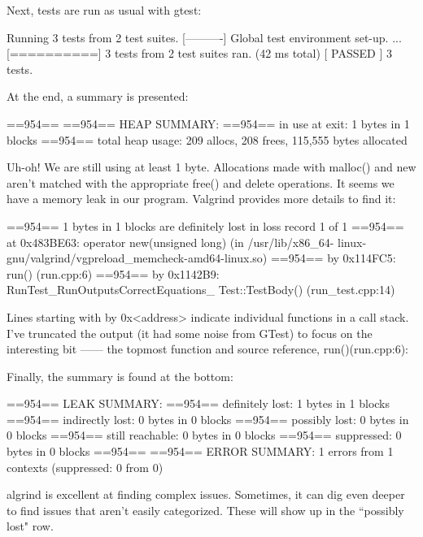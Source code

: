 Next, tests are run as usual with gtest:

\begin{shell}
[==========] Running 3 tests from 2 test suites.
[----------] Global test environment set-up.
...
[==========] 3 tests from 2 test suites ran. (42 ms total)
[ PASSED ] 3 tests.
\end{shell}

At the end, a summary is presented:

\begin{shell}
==954==
==954== HEAP SUMMARY:
==954==     in use at exit: 1 bytes in 1 blocks
==954==   total heap usage: 209 allocs, 208 frees, 115,555 bytes allocated
\end{shell}

Uh-oh! We are still using at least 1 byte. Allocations made with malloc() and new aren’t matched with the appropriate free() and delete operations. It seems we have a memory leak in our program. Valgrind provides more details to find it:

\begin{shell}
==954== 1 bytes in 1 blocks are definitely lost in loss record 1 of 1
==954==   at 0x483BE63: operator new(unsigned long) (in /usr/lib/x86_64-
linux-gnu/valgrind/vgpreload_memcheck-amd64-linux.so)
==954==   by 0x114FC5: run() (run.cpp:6)
==954==   by 0x1142B9: RunTest_RunOutputsCorrectEquations_
Test::TestBody() (run_test.cpp:14)
\end{shell}

Lines starting with by 0x<address> indicate individual functions in a call stack. I’ve truncated the output (it had some noise from GTest) to focus on the interesting bit —— the topmost function and source reference, run()(run.cpp:6):

Finally, the summary is found at the bottom:

\begin{shell}
==954== LEAK SUMMARY:
==954==    definitely lost: 1 bytes in 1 blocks
==954==    indirectly lost: 0 bytes in 0 blocks
==954==      possibly lost: 0 bytes in 0 blocks
==954==    still reachable: 0 bytes in 0 blocks
==954==         suppressed: 0 bytes in 0 blocks
==954==
==954== ERROR SUMMARY: 1 errors from 1 contexts (suppressed: 0 from 0)
\end{shell}

algrind is excellent at finding complex issues. Sometimes, it can dig even deeper to find issues that aren’t easily categorized. These will show up in the “possibly lost" row.

